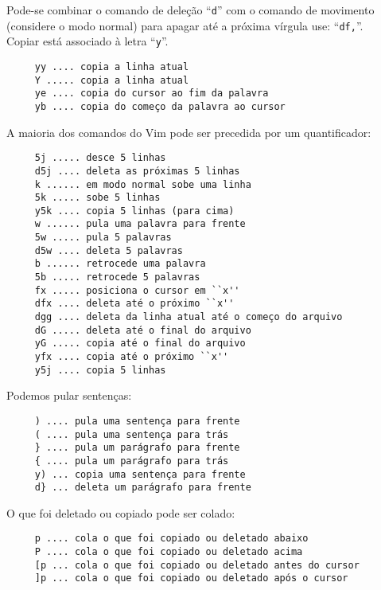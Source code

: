 {\Large {}} Pode-se combinar o comando de deleção ``\verb+d+'' com o
comando de movimento (considere o modo normal) para apagar até a
próxima vírgula use: ``\verb+df,+''. \\


Copiar está associado à letra ``\verb|y|''.

\begin{verbatim}
     yy .... copia a linha atual
     Y ..... copia a linha atual
     ye .... copia do cursor ao fim da palavra
     yb .... copia do começo da palavra ao cursor
\end{verbatim}

A maioria dos comandos do Vim pode ser precedida por um quantificador:

\begin{verbatim}
     5j ..... desce 5 linhas
     d5j .... deleta as próximas 5 linhas
     k ...... em modo normal sobe uma linha
     5k ..... sobe 5 linhas
     y5k .... copia 5 linhas (para cima)
     w ...... pula uma palavra para frente
     5w ..... pula 5 palavras
     d5w .... deleta 5 palavras
     b ...... retrocede uma palavra
     5b ..... retrocede 5 palavras
     fx ..... posiciona o cursor em ``x''
     dfx .... deleta até o próximo ``x''
     dgg .... deleta da linha atual até o começo do arquivo
     dG ..... deleta até o final do arquivo
     yG ..... copia até o final do arquivo
     yfx .... copia até o próximo ``x''
     y5j .... copia 5 linhas
\end{verbatim}

Podemos pular sentenças:

\begin{verbatim}
     ) .... pula uma sentença para frente
     ( .... pula uma sentença para trás
     } .... pula um parágrafo para frente
     { .... pula um parágrafo para trás
     y) ... copia uma sentença para frente
     d} ... deleta um parágrafo para frente
\end{verbatim}

O que foi deletado ou copiado pode ser colado:

\begin{verbatim}
     p .... cola o que foi copiado ou deletado abaixo
     P .... cola o que foi copiado ou deletado acima
     [p ... cola o que foi copiado ou deletado antes do cursor
     ]p ... cola o que foi copiado ou deletado após o cursor
\end{verbatim}

